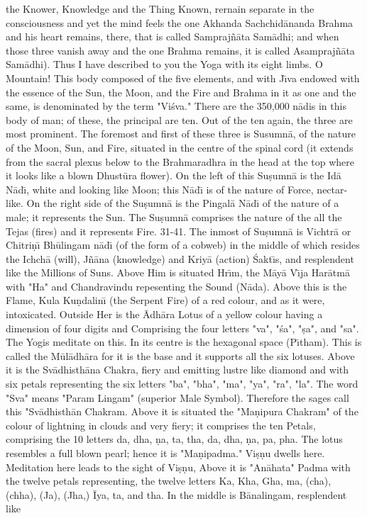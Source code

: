 the Knower, Knowledge and the Thing Known, rernain separate in the consciousness and yet the mind feels the one Akhanda Sachchid\=ananda Brahma and his heart remains, there, that is called Sampraj\~n\=ata Sam\=adhi; and when those three vanish away and the one Brahma remains, it is called Asampraj\~n\=ata Sam\=adhi). Thus I have described to you the Yoga with its eight limbs. O Mountain! This body composed of the five elements, and with J\={\i}va endowed with the essence of the Sun, the Moon, and the Fire and Brahma in it as one and the same, is denominated by the term "Vi\'sva." There are the 350,000 n\=adis in this body of man; of these, the principal are ten. Out of the ten again, the three are most prominent. The foremost and first of these three is Susumn\=a, of the nature of the Moon, Sun, and Fire, situated in the centre of the spinal cord (it extends from the sacral plexus below to the Brahmaradhra in the head at the top where it looks like a blown Dhust\=ura flower). On the left of this Su\d{s}umn\=a is the Id\=a N\=ad\={\i}, white and looking like Moon; this N\=ad\={\i} is of the nature of Force, nectar-like. On the right side of the Su\d{s}umn\=a is the Pingal\=a N\=ad\={\i} of the nature of a male; it represents the Sun. The Su\d{s}umn\=a comprises the nature of the all the Tejas (fires) and it represents Fire.
31-41. The inmost of Su\d{s}umn\=a is Vichtr\=a or Chitri\d{n}\={\i} Bh\=ulingam n\=ad\={\i} (of the form of a cobweb) in the middle of which resides the Ichch\=a (will), J\~n\=ana (knowledge) and Kriy\=a (action) \'Sakt\={\i}s, and resplendent like the Millions of Suns. Above Him is situated Hr\={\i}m, the M\=ay\=a V\={\i}ja Har\=atm\=a with "Ha" and Chandravindu repesenting the Sound (N\=ada). Above this is the Flame, Kula Ku\d{n}dalin\={\i} (the Serpent Fire) of a red colour, and as it were, intoxicated. Outside Her is the \=Adh\=ara Lotus of a yellow colour having a dimension of four digits and Comprising the four letters "va", "\'sa", "\d{s}a", and "sa". The Yogis meditate on this. In its centre is the hexagonal space (P\={\i}tham). This is called the M\=ul\=adh\=ara for it is the base and it supports all the six lotuses. Above it is the Sv\=adhisth\=ana Chakra, fiery and emitting lustre like diamond and with six petals representing the six letters "ba", "bha", "ma", "ya", "ra", "la". The word "Sva" means "Param Lingam" (superior Male Symbol). Therefore the sages call this "Sv\=adhisth\=an Chakram. Above it is situated the "Ma\d{n}ipura Chakram" of the colour of lightning in clouds and very fiery; it comprises the ten Petals, comprising the 10 letters da, dha, \d{n}a, ta, tha, da, dha, \d{n}a, pa, pha. The lotus resembles a full blown pearl; hence it is "Ma\d{n}ipadma." Vi\d{s}\d{n}u dwells here. Meditation here leads to the sight of Vi\d{s}\d{n}u, Above it is "An\=ahata" Padma with the twelve petals representing, the twelve letters Ka, Kha, Gha, ma, (cha), (chha), (Ja), (Jha,) \=Iya, ta, and tha. In the middle is B\=analingam, resplendent like


